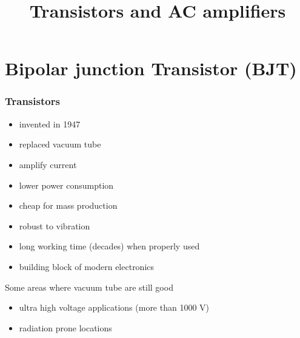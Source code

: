 \documentclass[beamer]{standalone}
\begin{document}
\title[Electronics 1]{Transistors and AC amplifiers}

\begin{frame} 
  \titlepage
\end{frame}

\section{Bipolar junction Transistor (BJT)}
\begin{frame}
\frametitle{Transistors}
\begin{itemize}
	\item invented in 1947
	\item replaced vacuum tube 
	\item \alert{amplify current}
	\item lower power consumption
	\item cheap for mass production
	\item robust to vibration
	\item long working time (decades) when properly used
	\item building block of modern electronics
\end{itemize}
Some areas where vacuum tube are still good
\begin{itemize}
	\item ultra high voltage applications (more than 1000 V)
	\item radiation prone locations
\end{itemize}
\end{frame}
	
\end{document}
